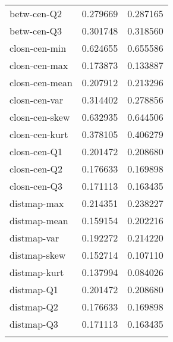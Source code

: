 \begin{longtable}{lrr}
	betw-cen-Q2                   &  0.279669 &  0.287165 \\
	betw-cen-Q3                   &  0.301748 &  0.318560 \\
	closn-cen-min                 &  0.624655 &  0.655586 \\
	closn-cen-max                 &  0.173873 &  0.133887 \\
	closn-cen-mean                &  0.207912 &  0.213296 \\
	closn-cen-var                 &  0.314402 &  0.278856 \\
	closn-cen-skew                &  0.632935 &  0.644506 \\
	closn-cen-kurt                &  0.378105 &  0.406279 \\
	closn-cen-Q1                  &  0.201472 &  0.208680 \\
	closn-cen-Q2                  &  0.176633 &  0.169898 \\
	closn-cen-Q3                  &  0.171113 &  0.163435 \\
	distmap-max                   &  0.214351 &  0.238227 \\
	distmap-mean                  &  0.159154 &  0.202216 \\
	distmap-var                   &  0.192272 &  0.214220 \\
	distmap-skew                  &  0.152714 &  0.107110 \\
	distmap-kurt                  &  0.137994 &  0.084026 \\
	distmap-Q1                    &  0.201472 &  0.208680 \\
	distmap-Q2                    &  0.176633 &  0.169898 \\
	distmap-Q3                    &  0.171113 &  0.163435 \\
	\label{tab:results-stats}
\end{longtable}



